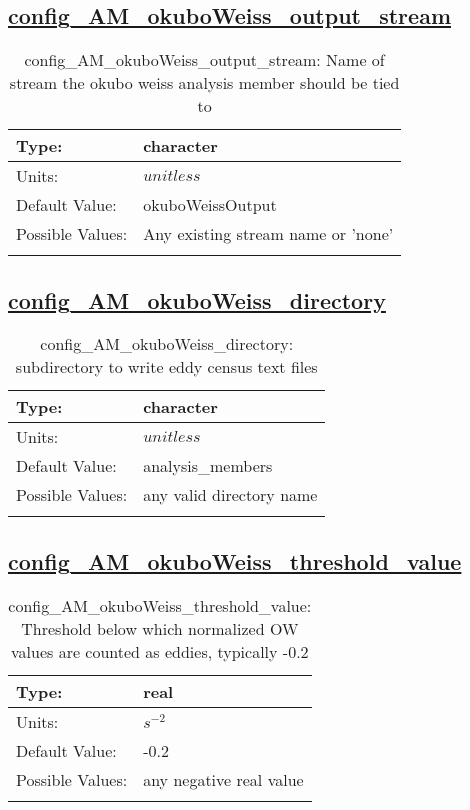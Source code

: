 \subsection[config\_AM\_okuboWeiss\_output\_stream]{\hyperref[sec:nm_tab_AM_okuboWeiss]{config\_AM\_okuboWeiss\_output\_stream}}
\label{subsec:nm_sec_config_AM_okuboWeiss_output_stream}
\begin{center}
\begin{longtable}{| p{2.0in} || p{4.0in} |}
    \hline
    Type: & character \\
    \hline
    Units: & $unitless$ \\
    \hline
    Default Value: & okuboWeissOutput \\
    \hline
    Possible Values: & Any existing stream name or 'none' \\
    \hline
    \caption{config\_AM\_okuboWeiss\_output\_stream: Name of stream the okubo weiss analysis member should be tied to}
\end{longtable}
\end{center}
\subsection[config\_AM\_okuboWeiss\_directory]{\hyperref[sec:nm_tab_AM_okuboWeiss]{config\_AM\_okuboWeiss\_directory}}
\label{subsec:nm_sec_config_AM_okuboWeiss_directory}
\begin{center}
\begin{longtable}{| p{2.0in} || p{4.0in} |}
    \hline
    Type: & character \\
    \hline
    Units: & $unitless$ \\
    \hline
    Default Value: & analysis\_members \\
    \hline
    Possible Values: & any valid directory name \\
    \hline
    \caption{config\_AM\_okuboWeiss\_directory: subdirectory to write eddy census text files}
\end{longtable}
\end{center}
\subsection[config\_AM\_okuboWeiss\_threshold\_value]{\hyperref[sec:nm_tab_AM_okuboWeiss]{config\_AM\_okuboWeiss\_threshold\_value}}
\label{subsec:nm_sec_config_AM_okuboWeiss_threshold_value}
\begin{center}
\begin{longtable}{| p{2.0in} || p{4.0in} |}
    \hline
    Type: & real \\
    \hline
    Units: & $s^{-2}$ \\
    \hline
    Default Value: & -0.2 \\
    \hline
    Possible Values: & any negative real value \\
    \hline
    \caption{config\_AM\_okuboWeiss\_threshold\_value: Threshold below which normalized OW values are counted as eddies, typically -0.2}
\end{longtable}
\end{center}
